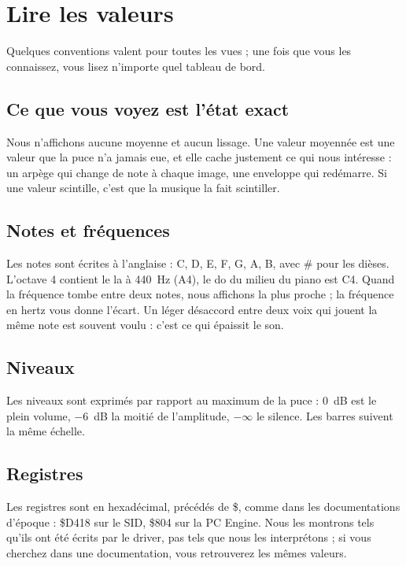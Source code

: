 \chapter{Lire les valeurs}

Quelques conventions valent pour toutes les vues ; une fois que vous les connaissez, vous lisez n'importe quel
tableau de bord.

\section{Ce que vous voyez est l'état exact}
Nous n'affichons aucune moyenne et aucun lissage. Une valeur moyennée est une valeur que la puce n'a jamais eue, et
elle cache justement ce qui nous intéresse : un arpège qui change de note à chaque image, une enveloppe qui
redémarre. Si une valeur scintille, c'est que la musique la fait scintiller.

\section{Notes et fréquences}
Les notes sont écrites à l'anglaise : C, D, E, F, G, A, B, avec \# pour les dièses. L'octave 4 contient le la à
440~Hz (A4), le do du milieu du piano est C4. Quand la fréquence tombe entre deux notes, nous affichons la plus
proche ; la fréquence en hertz vous donne l'écart. Un léger désaccord entre deux voix qui jouent la même note est
souvent voulu : c'est ce qui épaissit le son.

\section{Niveaux}
Les niveaux sont exprimés par rapport au maximum de la puce : 0~dB est le plein volume, $-6$~dB la moitié de
l'amplitude, $-\infty$ le silence. Les barres suivent la même échelle.

\section{Registres}
Les registres sont en hexadécimal, précédés de \$, comme dans les documentations d'époque : \$D418 sur le SID,
\$804 sur la PC Engine. Nous les montrons tels qu'ils ont été écrits par le driver, pas tels que nous les
interprétons ; si vous cherchez dans une documentation, vous retrouverez les mêmes valeurs.

